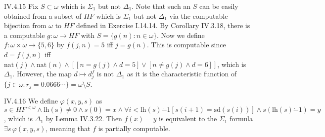 \documentclass[12pt]{article}
\begin{document}
\begin{customthm}{IV.4.15}
  Fix $S\subset\omega$ which is $\Sigma_1$ but not $\Delta_1$. Note that such an $S$ can be easily obtained from a subset of $HF$ which is $\Sigma_1$ but not $\Delta_1$ via the computable bijection from $\omega$ to $HF$ defined in Exercise I.14.14. By Corollary IV.3.18, there is a computable $g:\omega\rightarrow HF$ with $S=\{g(n):n\in\omega\}$. Now we define $f:\omega\times\omega\rightarrow\{5,6\}$ by $f(j,n)=5$ iff $j=g(n)$. This is computable since $d=f(j,n)$ iff $\mathrm{nat}(j)\wedge\mathrm{nat}(n)\wedge[[n=g(j)\wedge d=5]\vee[n\neq g(j)\wedge d=6]]$, which is $\Delta_1$. However, the map $d\mapsto d_j^f$ is not $\Delta_1$ as it is the characteristic function of $\{j\in\omega:r_j=0.0666\cdots\}=\omega\setminus S$.
\end{customthm}

\begin{customthm}{IV.4.16}
  We define $\varphi(x,y,s)$ as $s\in HF^{<\omega}\wedge \mathrm{lh(s)}\neq0\wedge s(0)=x\wedge\forall i<\mathrm{lh}(s)\dot{-}1[s(i+1)=\mathrm{sd}(s(i))]\wedge s(\mathrm{lh}(s)\dot{-}1)=y$, which is $\Delta_1$ by Lemma IV.3.22. Then $f(x)=y$ is equivalent to the $\Sigma_1$ formula $\exists s\,\varphi(x,y,s)$, meaning that $f$ is partially computable.
\end{customthm}
\end{document}
